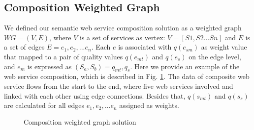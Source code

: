 \documentclass{IEEEtran}
\begin{document}
\subsection{Composition Weighted Graph}
We defined our semantic web service composition solution as a weighted graph $WG = (V, E)$, where $V$ is a set of services as vertex: $V=[S1, S2...Sn]$ and $E$ is a set of edges $E = {e_{1}, e_{2},... e_{n}}$. Each $e$ is associated with $q(e_{sm})$ as weight value that mapped to a pair of quality values $q(e_{mt})$ and $q(e_{s})$ on the edge level, and $e_{m}$ is expressed as $(S_{a},S_{b})={q_{mt}, q_{s}}$. Here we provide an example of the web service composition, which is described in Fig. \ref{wscs}. The data of composite web service flows from the start to the end, where five web services involved and linked with each other using edge connections. Besides that, $q(s_{mt})$ and $q(s_{s})$ are calculated for all edges ${e_{1}, e_{2},... e_{n}}$ assigned as weights.

\begin{figure}[h]
\centering
{}
 \caption{Composition weighted graph solution}
 \label{wscs}
\end{figure}
\end{document}
